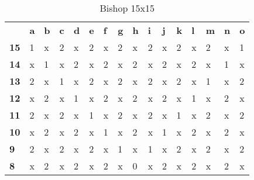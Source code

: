\documentclass{article}
\begin{document}
\begin{table}[H]
\centering
\caption{Bishop 15x15}
\label{my-label}
\begin{tabular}{llllllllllllllll}
                                 & \textbf{a} & \textbf{b} & \textbf{c} & \textbf{d} & \textbf{e} & \textbf{f} & \textbf{g} & \textbf{h} & \textbf{i} & \textbf{j} & \textbf{k} & \textbf{l} & \textbf{m} & \textbf{n} & \textbf{o} \\ \cline{2-16} 
\multicolumn{1}{l|}{\textbf{15}} & 1          & x          & 2          & x          & 2          & x          & 2          & x          & 2          & x          & 2          & x          & 2          & x          & 1          \\
\multicolumn{1}{l|}{\textbf{14}} & x          & 1          & x          & 2          & x          & 2          & x          & 2          & x          & 2          & x          & 2          & x          & 1          & x          \\
\multicolumn{1}{l|}{\textbf{13}} & 2          & x          & 1          & x          & 2          & x          & 2          & x          & 2          & x          & 2          & x          & 1          & x          & 2          \\
\multicolumn{1}{l|}{\textbf{12}} & x          & 2          & x          & 1          & x          & 2          & x          & 2          & x          & 2          & x          & 1          & x          & 2          & x          \\
\multicolumn{1}{l|}{\textbf{11}} & 2          & x          & 2          & x          & 1          & x          & 2          & x          & 2          & x          & 1          & x          & 2          & x          & 2          \\
\multicolumn{1}{l|}{\textbf{10}} & x          & 2          & x          & 2          & x          & 1          & x          & 2          & x          & 1          & x          & 2          & x          & 2          & x          \\
\multicolumn{1}{l|}{\textbf{9}}  & 2          & x          & 2          & x          & 2          & x          & 1          & x          & 1          & x          & 2          & x          & 2          & x          & 2          \\
\multicolumn{1}{l|}{\textbf{8}}  & x          & 2          & x          & 2          & x          & 2          & x          & 0          & x          & 2          & x          & 2          & x          & 2          & x          \\

\end{tabular}
\end{table}
\end{document}
